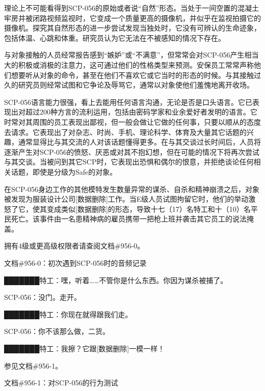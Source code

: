 理论上不可能看得到SCP-056的原始或者说“自然”形态。当处于一间空置的混凝土牢房并被闭路视频监视时，它变成一个质量更高的摄像机，并似乎在监视拍摄它的摄像机。探究其自然形态的进一步尝试发现当独处时，它没有可辨认的生命迹象，包括体温、心跳和体重。研究员认为它无法在不被感知的情况下存在。

与对象接触的人员经常报告感到“嫉妒”或“不满意”，但常常会对SCP-056产生相当大的积极或消极的注意力，这可通过他们的性格类型来预测。安保员工常常声称他们想要听从对象的命令，甚至在他们不喜欢它或它当时的形态的时候。与其接触过久的研究员则经常试图和它争论及辱骂它，通常以对象使他们羞愧地离开收场。

SCP-056语言能力很强，看上去能用任何语言沟通，无论是否是口头语言。它已表现出对超过200种方言的流利运用，包括由密码学家和业余爱好者发明的语言。它时常对其周围的员工表现出鄙视，但一般会做让它做的任何事，只要以顺从的态度去请求。它表现出了对杂志、时尚、手机、理论科学、体育及大量其它话题的兴趣，通常显得比与其交流的人对该话题懂得更多。在与其交谈过长时间后，人员将逐渐产生对SCP-056的愤怒、厌恶或对其不抱幻想，但在可能的情况下将再次尝试与其交谈。当被问到其它SCP时，它表现出恐惧和偶尔的恨意，并拒绝谈论任何相关话题，即使是分级为Safe的对象。

在SCP-056身边工作的其他模特发生数量异常的谋杀、自杀和精神崩溃之后，对象被发现为服装设计公司{[}数据删除]工作。当E级人员试图拘留它时，他们的举动激怒了它，使其变成类似{[}数据删除]的形态，导致十七（17）名特工和十（10）名平民死亡。该事件由一名患精神病的雇员携带一把枪上班并袭击其它员工的说法掩盖。

拥有4级或更高级权限者请查阅文档\#956-0。

文档\#956-0：初次遇到SCP-056时的音频记录


███████特工：嘿，听着……不管你是什么东西。你因为谋杀被捕了。

SCP-056：没门。走开。


███████特工：你现在就得跟我们走。

SCP-056：你不该那么做，二货。


███████特工：我擦？它跟{[}数据删除]一模一样！



参见文档\#956-1。

文档\#956-1：对SCP-056的行为测试

